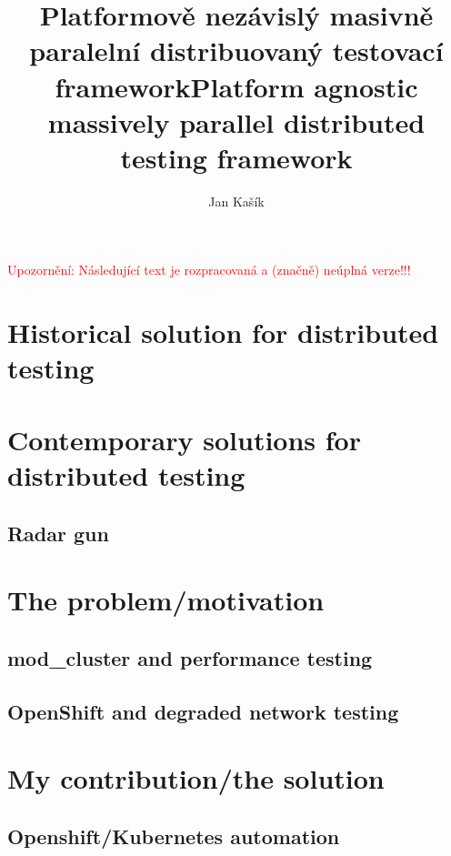 \documentclass[
  master,
  biblatex,
  glossaries,
  index
]{kidiplom}
\title{Platformově nezávislý masivně paralelní distribuovaný testovací framework}
\title[english]{Platform agnostic massively parallel distributed testing framework}
\author{Jan Kašík}
\begin{document}
\maketitle

\noindent\textcolor{red}{\LARGE Upozornění: Následující text je rozpracovaná a (značně) neúplná verze!!!}

\section{Historical solution for distributed testing}

\section{Contemporary solutions for distributed testing}

\subsection{Radar gun}

\section{The problem/motivation}

\subsection{mod\_cluster and performance testing}


\subsection{OpenShift and degraded network testing}


\section{My contribution/the solution}

\subsection{Openshift/Kubernetes automation}
\end{document}
